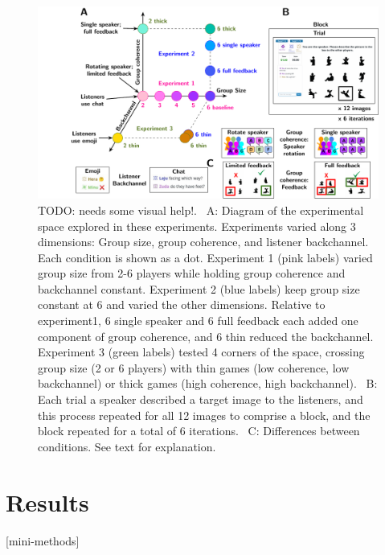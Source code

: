 \documentclass[
  english,
  a4paper,
]{article}
\begin{document}
\begin{figure}[t!]

{\centering \includegraphics[width=1\linewidth]{expt-diagram} 

}

\caption{TODO: needs some visual help!. \ A: Diagram of the experimental space explored in these experiments. Experiments varied along 3 dimensions: Group size, group coherence, and listener backchannel. Each condition is shown as a dot. Experiment 1 (pink labels) varied group size from 2-6 players while holding group coherence and backchannel constant. Experiment 2 (blue labels) keep group size constant at 6 and varied the other dimensions. Relative to experiment1, 6 single speaker and 6 full feedback each added one component of group coherence, and 6 thin reduced the backchannel. Experiment 3 (green labels) tested 4 corners of the space, crossing group size (2 or 6 players) with thin games (low coherence, low backchannel) or thick games (high coherence, high backchannel). \  B: Each trial a speaker described a target image to the listeners, and this process repeated for all 12 images to comprise a block, and the block repeated for a total of 6 iterations. \ C: Differences between conditions. See text for explanation.}\label{fig:diagram}
\end{figure}

\hypertarget{results}{%
\section{Results}\label{results}}

{[}mini-methods{]}
\end{document}
